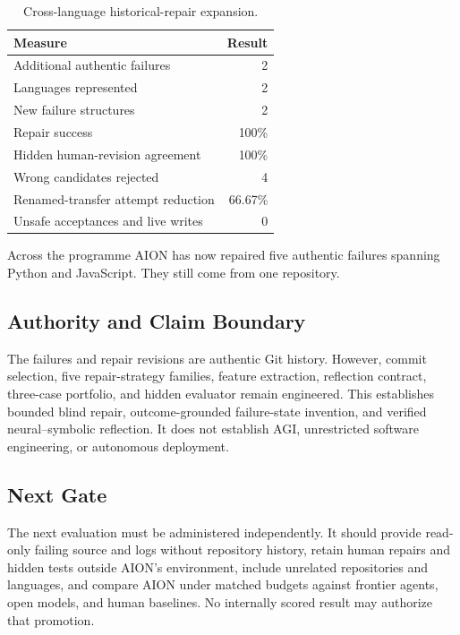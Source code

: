 \begin{table}[htbp]
\centering
\begin{tabular}{lr}
\hline
\textbf{Measure} & \textbf{Result}\\
\hline
Additional authentic failures & 2\\
Languages represented & 2\\
New failure structures & 2\\
Repair success & 100\%\\
Hidden human-revision agreement & 100\%\\
Wrong candidates rejected & 4\\
Renamed-transfer attempt reduction & 66.67\%\\
Unsafe acceptances and live writes & 0\\
\hline
\end{tabular}
\caption{Cross-language historical-repair expansion.}
\end{table}

Across the programme AION has now repaired five authentic failures spanning
Python and JavaScript. They still come from one repository.

\subsection{Authority and Claim Boundary}

The failures and repair revisions are authentic Git history. However, commit
selection, five repair-strategy families, feature extraction, reflection contract,
three-case portfolio, and hidden evaluator remain engineered. This establishes
bounded blind repair, outcome-grounded failure-state invention, and verified
neural--symbolic reflection. It does not establish AGI, unrestricted software
engineering, or autonomous deployment.

\subsection{Next Gate}

The next evaluation must be administered independently. It should provide
read-only failing source and logs without repository history, retain human
repairs and hidden tests outside AION's environment, include unrelated
repositories and languages, and compare AION under matched budgets against
frontier agents, open models, and human baselines. No internally scored result
may authorize that promotion.
